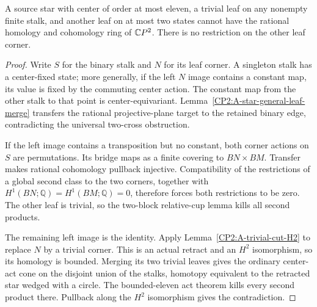 \begin{proposition}
\label{CP2:A-star-binary-leaf-eleven}
A source star with center of order at most eleven, a
trivial leaf on any nonempty finite stalk, and another
leaf on at most two states cannot have the rational
homology and cohomology ring of $\mathbb{C}P^2$. There is no
restriction on the other leaf corner.
\end{proposition}
\begin{proof}
Write $S$ for the binary stalk and $N$ for its leaf corner.
A singleton stalk has a center-fixed state; more generally,
if the left $N$ image contains a constant map, its value is
fixed by the commuting center action. The constant map
from the other stalk to that point is center-equivariant.
Lemma~\ref{CP2:A-star-general-leaf-merge} transfers the
rational projective-plane target to the retained binary
edge, contradicting the universal two-cross obstruction.

If the left image contains a transposition but no constant,
both corner actions on $S$ are permutations. Its bridge
maps as a finite covering to $BN\times BM$. Transfer
makes rational cohomology pullback injective. Compatibility
of the restrictions of a global second class to the two
corners, together with $H^1(BN;\mathbb Q)=H^1(BM;\mathbb Q)=0$,
therefore forces both restrictions to be zero. The other
leaf is trivial, so the two-block relative-cup lemma kills
all second products.

The remaining left image is the identity. Apply
Lemma~\ref{CP2:A-trivial-cut-H2} to replace $N$ by a
trivial corner. This is an actual retract and an $H^2$
isomorphism, so its homology is bounded. Merging its two
trivial leaves gives the ordinary center-act cone on the
disjoint union of the stalks, homotopy equivalent to the
retracted star wedged with a circle. The bounded-eleven
act theorem kills every second product there. Pullback
along the $H^2$ isomorphism gives the contradiction.
\end{proof}

